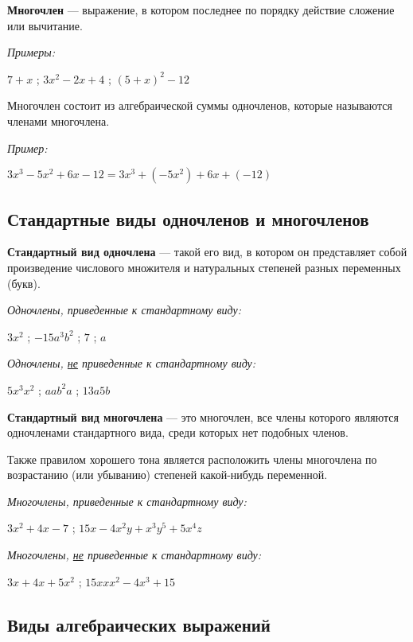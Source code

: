 \documentclass[12pt, a4paper]{article}
\begin{document}
	\textbf{Многочлен} — выражение, в котором последнее по порядку действие сложение или вычитание.
	
	\textit{Примеры:}
	\begin{center}
		 $7+x$ ; $3x^2-2x+4$ ; $(5+x)^2-12$
	\end{center}

	Многочлен состоит из алгебраической суммы одночленов, которые называются членами многочлена.
	
	\textit{Пример:}
	\begin{center}
		$3x^3-5x^2+6x-12 = 3x^3+(-5x^2)+6x+(-12)$
	\end{center}

	\newpage
	
	\subsection*{Стандартные виды одночленов и многочленов}
	
	\textbf{Стандартный вид одночлена} — такой его вид, в котором он представляет собой произведение числового множителя и натуральных степеней разных переменных (букв).
	
	\textit{Одночлены, приведенные к стандартному виду:}
	\begin{center}
		 $3x^2$ ; $-15a^3b^2$ ; $7$ ; $a$
	\end{center}

	\textit{Одночлены, \underline{не} приведенные к стандартному виду:}
	\begin{center}
		$5x^3x^2$ ; $aab^2a$ ; $13a5b$
	\end{center}
	
	\textbf{Стандартный вид многочлена} — это многочлен, все члены которого являются одночленами стандартного вида, среди которых нет подобных членов.
	
	Также правилом хорошего тона является расположить члены многочлена по возрастанию (или убыванию) степеней какой-нибудь переменной.
	
	\textit{Многочлены, приведенные к стандартному виду:}
	\begin{center}
		 $3x^2+4x-7$ ; $15x-4x^2y+x^3y^5+5x^4z$
	\end{center}

	\textit{Многочлены, \underline{не} приведенные к стандартному виду:}
	\begin{center}
		$3x+4x+5x^2$ ; $15xxx^2-4x^3+15$
	\end{center}
		
	\subsection*{Виды алгебраических выражений}
	
\end{document}
